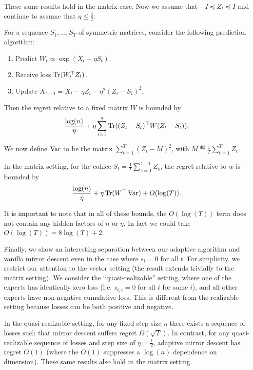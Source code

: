 \documentclass[11pt]{article}
\begin{document}
These same results hold in the matrix case. Now we assume that $-I \preceq Z_t \preceq I$ 
and continue to assume that $\eta \leq \frac{1}{2}$:
\begin{theorem}
For a sequence $S_1, \ldots, S_T$ of symmetric matrices, consider the following 
prediction algorithm:
\begin{enumerate}
\item Predict $W_t \propto \exp(X_t - \eta S_t)$.
\item Receive loss $\operatorname{Tr}(W_t^{\top}Z_t)$.
\item Update $X_{t+1} = X_t - \eta Z_t - \eta^2 (Z_t-S_t)^2$.
\end{enumerate}
Then the regret relative to a fixed matrix $W$ is bounded by
\[ \frac{\log(n)}{\eta} + \eta \sum_{i=1}^n \operatorname{Tr}((Z_t-S_t)^{\top}W(Z_t-S_t)). \]
\end{theorem}
We now define $\operatorname{Var}$ to be the matrix $\sum_{t=1}^T (Z_t-M)^2$, with $M \eqdef \frac{1}{T} \sum_{t=1}^T Z_t$.
\begin{corollary}
In the matrix setting, for the cohice $S_t = \frac{1}{t} \sum_{s=1}^{t-1} Z_s$, the 
regret relative to $w$ is bounded by
\[ \frac{\log(n)}{\eta} + \eta \operatorname{Tr}(W^{\top}\operatorname{Var}) + O(\log(T)). \]
\end{corollary}
It is important to note that in all of these bounds, the $O(\log(T))$ term does not 
contain any hidden factors of $n$ or $\eta$. In fact we could take $O(\log(T)) = 8\log(T) + 2$.

Finally, we show an interesting separation between our adaptive algorithm and vanilla mirror 
descent even in the case where $s_t = 0$ for all $t$. For simplicity, we restrict our attention to the vector 
setting (the result extends trivially to the matrix setting). We consider the ``quasi-realizable'' setting, 
where one of the experts has identically zero loss (i.e. $z_{t,i} = 0$ for all $t$ for some $i$), and all 
other experts have non-negative cumulative loss. This is different from the realizable setting because 
losses can be both positive and negative.

\begin{proposition}
In the quasi-realizable setting, for any fixed step size $\eta$ there 
exists a sequence of losses such that mirror descent suffers regret $\Omega(\sqrt{T})$. 
In contrast, for any quasi-realizable sequence of losses and step size of $\eta = \frac{1}{2}$, 
adaptive mirror descent has regret $O(1)$ (where the $O(1)$ suppresses a $\log(n)$ dependence 
on dimension). These same results also hold in the matrix setting.
\end{proposition}
\end{document}
